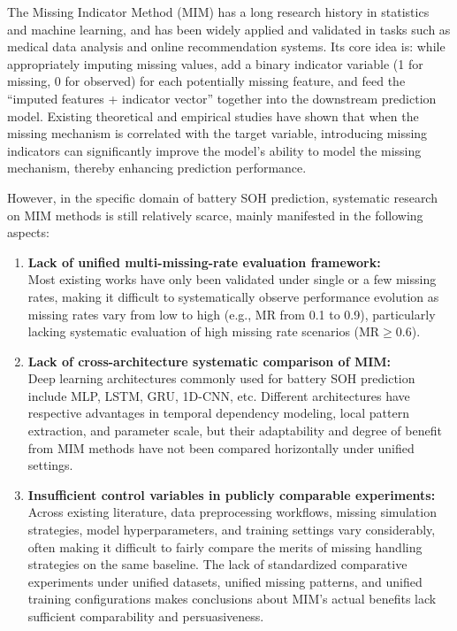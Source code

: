 \documentclass[10pt,a4paper]{article}
\begin{document}
The Missing Indicator Method (MIM) has a long research history in statistics and machine learning, and has been widely applied and validated in tasks such as medical data analysis and online recommendation systems\cite{jones1996indicator,van2023missing}. Its core idea is: while appropriately imputing missing values, add a binary indicator variable (1 for missing, 0 for observed) for each potentially missing feature, and feed the ``imputed features + indicator vector'' together into the downstream prediction model. Existing theoretical and empirical studies have shown that when the missing mechanism is correlated with the target variable, introducing missing indicators can significantly improve the model's ability to model the missing mechanism, thereby enhancing prediction performance\cite{sisk2023imputation,ehrig2025imputation}.

However, in the specific domain of battery SOH prediction, systematic research on MIM methods is still relatively scarce, mainly manifested in the following aspects:

\begin{enumerate}[label=(\arabic*)]
    \item \textbf{Lack of unified multi-missing-rate evaluation framework:}\\
    Most existing works have only been validated under single or a few missing rates, making it difficult to systematically observe performance evolution as missing rates vary from low to high (e.g., MR from 0.1 to 0.9), particularly lacking systematic evaluation of high missing rate scenarios (MR$\geq 0.6$).
    
    \item \textbf{Lack of cross-architecture systematic comparison of MIM:}\\
    Deep learning architectures commonly used for battery SOH prediction include MLP, LSTM, GRU, 1D-CNN, etc. Different architectures have respective advantages in temporal dependency modeling, local pattern extraction, and parameter scale, but their adaptability and degree of benefit from MIM methods have not been compared horizontally under unified settings.
    
    \item \textbf{Insufficient control variables in publicly comparable experiments:}\\
    Across existing literature, data preprocessing workflows, missing simulation strategies, model hyperparameters, and training settings vary considerably, often making it difficult to fairly compare the merits of missing handling strategies on the same baseline. The lack of standardized comparative experiments under unified datasets, unified missing patterns, and unified training configurations makes conclusions about MIM's actual benefits lack sufficient comparability and persuasiveness.
\end{enumerate}
\end{document}
